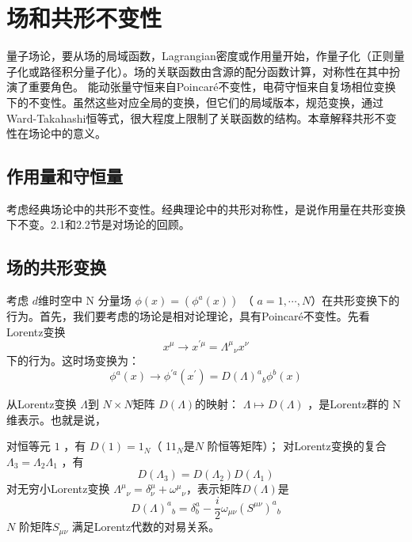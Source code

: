 \chapter{场和共形不变性}

量子场论，要从场的局域函数，Lagrangian密度或作用量开始，作量子化（正则量子化或路径积分量子化）。场的关联函数由含源的配分函数计算，对称性在其中扮演了重要角色。 能动张量守恒来自Poincaré不变性，电荷守恒来自复场相位变换下的不变性。虽然这些对应全局的变换，但它们的局域版本，规范变换，通过Ward-Takahashi恒等式，很大程度上限制了关联函数的结构。本章解释共形不变性在场论中的意义。

\section{作用量和守恒量}
考虑经典场论中的共形不变性。经典理论中的共形对称性，是说作用量在共形变换下不变。2.1和2.2节是对场论的回顾。
\section{场的共形变换}
考虑 $d $维时空中 N 分量场 $\phi(x)=\left(\phi^{a}(x)\right)$ （ $a=1,\cdots,N $）在共形变换下的行为。首先，我们要考虑的场论是相对论理论，具有Poincaré不变性。先看Lorentz变换
\begin{equation}
	x^{\mu} \rightarrow x^{\prime \mu}=\Lambda^{\mu} {}_{\nu}x^{\nu}
\end{equation}
下的行为。这时场变换为：
\begin{equation}
	\phi^{a}(x) \rightarrow \phi^{\prime a}\left(x^{\prime}\right)=D(\Lambda)^{a}{ }_{b} \phi^{b}(x)
\end{equation}

从Lorentz变换 $\Lambda $到 $N\times N $矩阵 $D(\Lambda) $的映射： $\Lambda \mapsto D(\Lambda)$ ，是Lorentz群的 N 维表示。也就是说，

对恒等元 $1$ ，有 $D(1)=1_N $（ 1$1_N $是$ N$ 阶恒等矩阵）；
对Lorentz变换的复合 $\Lambda_3=\Lambda_2\Lambda_1$ ，有
\begin{equation}
	D\left(\Lambda_{3}\right)=D\left(\Lambda_{2}\right) D\left(\Lambda_{1}\right)
\end{equation}
对无穷小Lorentz变换 $\Lambda^{\mu}{}_{\nu}=\delta_{\nu}^{\mu}+\omega^{\mu}{}_{\nu} $，表示矩阵$ D(\Lambda) $是
\begin{equation}
	D(\Lambda)^{a}{}_{b}=\delta_{b}^{a}-\frac{i}{2} \omega_{\mu \nu}\left(S^{\mu \nu}\right)^{a}{}_{b}
\end{equation}
$N$ 阶矩阵$ S_{\mu \nu}$ 满足Lorentz代数的对易关系。

